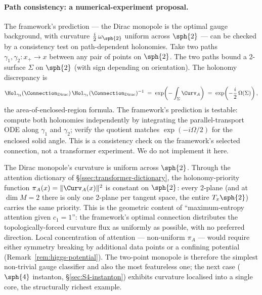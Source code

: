 \paragraph{Path consistency: a numerical-experiment proposal.} The
framework's prediction --- the Dirac monopole is the optimal gauge
background, with curvature $\tfrac{i}{2}\,\omega_{\sph{2}}$ uniform
across $\sph{2}$ --- can be checked by a consistency test on
path-dependent holonomies. Take two paths $\gamma_1, \gamma_2\colon
x_+\to x$ between any pair of points on $\sph{2}$. The two paths
bound a 2-surface $\Sigma$ on $\sph{2}$ (with sign depending on
orientation). The holonomy discrepancy is
\[
   \Hol_{\gamma_2}(\Connection_{\mathrm{Dirac}})
   \,\Hol_{\gamma_1}(\Connection_{\mathrm{Dirac}})^{-1}
   \;=\;\exp\!\left(-\int_\Sigma\Curv_A\right)
   \;=\;\exp\!\left(-\frac{i}{2}\,\Omega(\Sigma)\right),
\]
the area-of-enclosed-region formula. The framework's prediction is
testable: compute both holonomies independently by integrating the
parallel-transport ODE along $\gamma_1$ and $\gamma_2$; verify the
quotient matches $\exp(-i\Omega/2)$ for the enclosed solid angle.
This is a consistency check on the framework's selected connection,
not a transformer experiment. We do not implement it here.

\begin{remark}
\label{rem:S2-uniform-attention}
The Dirac monopole's curvature is uniform across $\sph{2}$. Through
the attention dictionary of \S\ref{ssec:transformer-dictionary}, the
holonomy-priority function $\pi_A(x)=\|\Curv_A(x)\|^2$ is constant
on $\sph{2}$: every 2-plane (and at $\dim M=2$ there is only one
2-plane per tangent space, the entire $T_x\sph{2}$) carries the
same priority. This is the geometric content of
``maximum-entropy attention given $c_1=1$'': the framework's
optimal connection distributes the topologically-forced curvature
flux as uniformly as possible, with no preferred direction. Local
concentration of attention --- non-uniform $\pi_A$ --- would
require either symmetry breaking by additional data points or a
confining potential (Remark~\ref{rem:higgs-potential}). The
two-point monopole is therefore the simplest non-trivial gauge
classifier and also the most featureless one; the next case
($\sph{4}$ instanton, \S\ref{sec:S4-instanton}) exhibits curvature
localised into a single core, the structurally richest example.
\end{remark}

